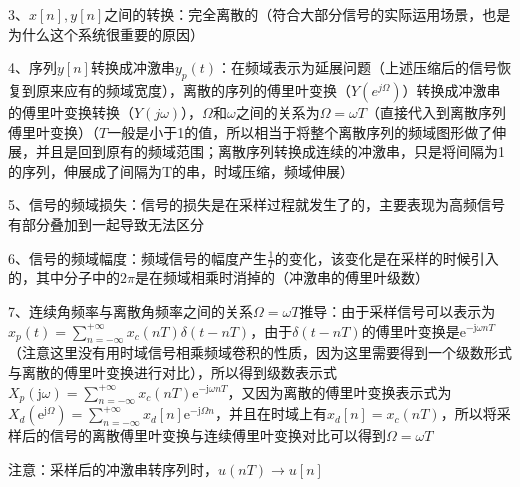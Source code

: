 3、$x[n],y[n]$之间的转换：完全离散的（符合大部分信号的实际运用场景，也是为什么这个系统很重要的原因）

4、序列$y[n]$转换成冲激串$y_p(t)$：在频域表示为延展问题（上述压缩后的信号恢复到原来应有的频域宽度），离散的序列的傅里叶变换（$Y(e^{j\Omega})$）转换成冲激串的傅里叶变换转换（$Y(j\omega)$），$\Omega$和$\omega$之间的关系为$\Omega=\omega T$（直接代入到离散序列傅里叶变换）（$T$一般是小于1的值，所以相当于将整个离散序列的频域图形做了伸展，并且是回到原有的频域范围；离散序列转换成连续的冲激串，只是将间隔为1的序列，伸展成了间隔为T的串，时域压缩，频域伸展）

5、信号的频域损失：信号的损失是在采样过程就发生了的，主要表现为高频信号有部分叠加到一起导致无法区分

6、信号的频域幅度：频域信号的幅度产生$\frac 1{T}$的变化，该变化是在采样的时候引入的，其中分子中的$2\pi$是在频域相乘时消掉的（冲激串的傅里叶级数）

7、连续角频率与离散角频率之间的关系$\Omega=\omega T$推导：由于采样信号可以表示为$x_{p}(t)=\sum_{n=-\infty}^{+\infty} x_{c}(n T) \delta(t-n T)$，由于$\delta(t-n T)$的傅里叶变换是$\mathrm{e}^{-\mathrm{j} \omega n T}$（注意这里没有用时域信号相乘频域卷积的性质，因为这里需要得到一个级数形式与离散的傅里叶变换进行对比），所以得到级数表示式$X_{p}(\mathrm{j} \omega)=\sum_{n=-\infty}^{+\infty} x_{c}(n T) \mathrm{e}^{-\mathrm{j} \omega n T}$，又因为离散的傅里叶变换表示式为$X_{d}\left(\mathrm{e}^{\mathrm{j} \Omega}\right)=\sum_{n=-\infty}^{+\infty} x_{d}[n] \mathrm{e}^{-\mathrm{j} \Omega n}$，并且在时域上有$x_{d}[n]=x_{c}(n T)$，所以将采样后的信号的离散傅里叶变换与连续傅里叶变换对比可以得到$\Omega=\omega T$

注意：采样后的冲激串转序列时，$u(nT) \rightarrow u[n]$


